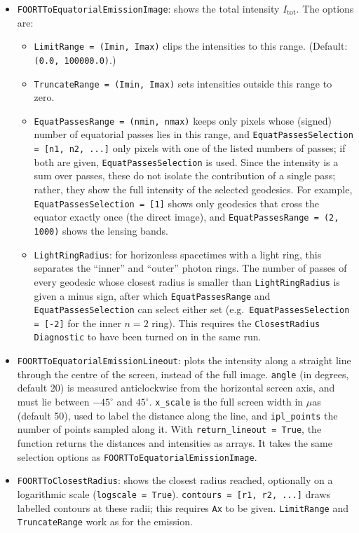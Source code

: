 \documentclass[11pt,a4paper]{article}
\newcommand{\code}[1]{{\tt #1}}
\begin{document}
\begin{itemize}
 \item \code{FOORTToEquatorialEmissionImage}: shows the total intensity $I_\text{tot}$. The options are:
 \begin{itemize}
  \item \code{LimitRange = (Imin, Imax)} clips the intensities to this range. (Default: \code{(0.0, 100000.0)}.)
  \item \code{TruncateRange = (Imin, Imax)} sets intensities outside this range to zero.
  \item \code{EquatPassesRange = (nmin, nmax)} keeps only pixels whose (signed) number of equatorial passes lies in this range, and \code{EquatPassesSelection = [n1, n2, ...]} only pixels with one of the listed numbers of passes; if both are given, \code{EquatPassesSelection} is used. Since the intensity is a sum over passes, these do not isolate the contribution of a single pass; rather, they show the full intensity of the selected geodesics. For example, \code{EquatPassesSelection = [1]} shows only geodesics that cross the equator exactly once (the direct image), and \code{EquatPassesRange = (2, 1000)} shows the lensing bands.
  \item \code{LightRingRadius}: for horizonless spacetimes with a light ring, this separates the ``inner'' and ``outer'' photon rings. The number of passes of every geodesic whose closest radius is smaller than \code{LightRingRadius} is given a minus sign, after which \code{EquatPassesRange} and \code{EquatPassesSelection} can select either set (e.g.\ \code{EquatPassesSelection = [-2]} for the inner $n=2$ ring). This requires the \code{ClosestRadius} \code{Diagnostic} to have been turned on in the same run. 
 \end{itemize}
 \item \code{FOORTToEquatorialEmissionLineout}: plots the intensity along a straight line through the centre of the screen, instead of the full image. \code{angle} (in degrees, default 20) is measured anticlockwise from the horizontal screen axis, and must lie between $-45^\circ$ and $45^\circ$. \code{x\_scale} is the full screen width in $\mu$as (default 50), used to label the distance along the line, and \code{ipl\_points} the number of points sampled along it. With \code{return\_lineout = True}, the function returns the distances and intensities as arrays. It takes the same selection options as \code{FOORTToEquatorialEmissionImage}.
 \item \code{FOORTToClosestRadius}: shows the closest radius reached, optionally on a logarithmic scale (\code{logscale = True}). \code{contours = [r1, r2, ...]} draws labelled contours at these radii; this requires \code{Ax} to be given. \code{LimitRange} and \code{TruncateRange} work as for the emission.

\end{itemize}
\end{document}

